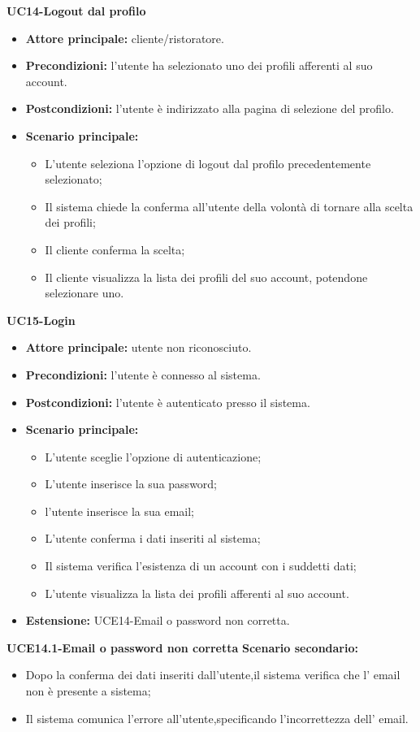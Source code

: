 \textbf{UC14-Logout dal profilo}
\begin{itemize}
\item \textbf{Attore principale:} cliente/ristoratore.
\item \textbf{Precondizioni:} l'utente ha selezionato uno dei profili afferenti al suo account.
\item \textbf{Postcondizioni:} l'utente è indirizzato alla pagina di selezione del profilo.
\item \textbf{Scenario principale:}
\begin{itemize}
    \item L'utente seleziona l'opzione di logout dal profilo precedentemente selezionato;
    \item Il sistema chiede la conferma all'utente della volontà di tornare alla scelta dei profili;
    \item Il cliente conferma la scelta;
    \item Il cliente visualizza la lista dei profili del suo account, potendone selezionare uno.
\end{itemize}
\end{itemize}

\textbf{UC15-Login}
\begin{itemize}
\item \textbf{Attore principale:} utente non riconosciuto.
\item \textbf{Precondizioni:} l'utente è connesso al sistema.
\item \textbf{Postcondizioni:} l'utente è autenticato presso il sistema.
\item \textbf{Scenario principale:}
\begin{itemize}
    \item L'utente sceglie l'opzione di autenticazione;
    \item L'utente inserisce la sua password;
    \item l'utente inserisce la sua email;
    \item L'utente conferma i dati inseriti al sistema;
    \item Il sistema verifica l'esistenza di un account con i suddetti dati;
    \item L'utente visualizza la lista dei profili afferenti al suo account.
\end{itemize}
    \item \textbf{Estensione: }UCE14-Email o password non corretta.
\end{itemize}

\textbf{UCE14.1-Email o password non corretta}
\textbf{Scenario secondario:}
\begin{itemize}
    \item Dopo la conferma dei dati inseriti dall'utente,il sistema verifica 
    che l' email non è presente a sistema;
    \item Il sistema comunica l'errore all'utente,specificando l'incorrettezza dell'
    email.
\end{itemize}

